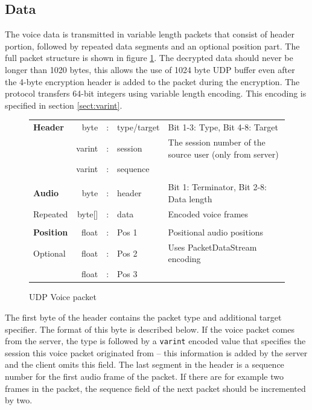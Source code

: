 \documentclass[11pt]{article} %
\begin{document}
\subsection{Data}
\label{sect:udpdata}

The voice data is transmitted in variable length packets that consist of header portion, followed by repeated data segments and an optional position part. The full packet structure is shown in figure \ref{fig:udpvoice}. The decrypted data should never be longer than 1020 bytes, this allows the use of 1024 byte UDP buffer even after the 4-byte encryption header is added to the packet during the encryption. The protocol transfers 64-bit integers using variable length encoding. This encoding is specified in section \ref{sect:varint}.

\begin{figure}[H]\begin{center}\begin{tabular}{l|rcl|p{}}

\cline{2-4}
\textbf{Header} & byte &:& type/target & Bit 1-3: Type, Bit 4-8: Target \\
				\cline{2-4}
				& varint &:& session & The session number of the source user (only from server) \\
				\cline{2-4}
				& varint &:& sequence & \\
				\cline{2-4}
\multicolumn{5}{c}{} \\
				\cline{2-4}
\textbf{Audio}	& byte &:& header & Bit 1: Terminator, Bit 2-8: Data length \\
				\cline{2-4}
Repeated		& byte[] &:& data & Encoded voice frames\\
				\cline{2-4}
\multicolumn{5}{c}{} \\
				\cline{2-4}

\textbf{Position} & float &:& Pos 1 & Positional audio positions \\
				\cline{2-4}
Optional		& float &:& Pos 2 & Uses PacketDataStream encoding \\
				\cline{2-4}
				& float &:& Pos 3 & \\
				\cline{2-4}

\end{tabular}
\caption{UDP Voice packet}\label{fig:udpvoice}
\end{center}\end{figure}

The first byte of the header contains the packet type and additional target specifier. The format of this byte is described below. If the voice packet comes from the server, the type is followed by a \texttt{varint} encoded value that specifies the session this voice packet originated from -- this information is added by the server and the client omits this field. The last segment in the header is a sequence number for the first audio frame of the packet. If there are for example two frames in the packet, the sequence field of the next packet should be incremented by two.
\end{document}
